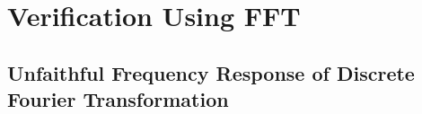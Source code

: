\documentclass[twoside]{article}
\numberwithin{equation}{section}
\newcommand{\eqspace}{\;\;\;}
\begin{document}
\clearpage
\section{Verification Using FFT}
\label{sec: FFT}


\subsection{Unfaithful Frequency Response of Discrete Fourier Transformation \cite{Prev_Precision_Arithmetic}}

\end{document}
